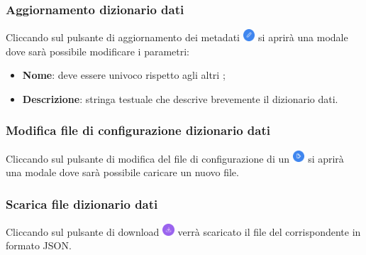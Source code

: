 \subsubsection{Aggiornamento dizionario dati}
Cliccando sul pulsante di aggiornamento dei metadati \includegraphics[height=1.2em]{assets/dd_edit_metadata_button.png} si aprirà una modale dove sarà possibile modificare i parametri:
\begin{itemize}
  \item \textbf{Nome}: deve essere univoco rispetto agli altri ;
  \item \textbf{Descrizione}: stringa testuale che descrive brevemente il dizionario dati.
\end{itemize}

\subsubsection{Modifica file di configurazione dizionario dati}
Cliccando sul pulsante di modifica del file di configurazione di un  \includegraphics[height=1.2em]{assets/dd_edit_button.png} si aprirà una modale dove sarà possibile caricare un nuovo file.

\subsubsection{Scarica file dizionario dati}
Cliccando sul pulsante di download \includegraphics[height=1.2em]{assets/dd_download_button.png} verrà scaricato il file del  corrispondente in formato JSON.

